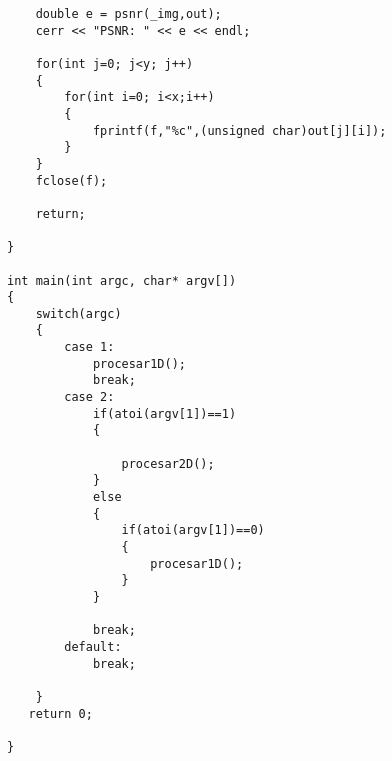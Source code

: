 \begin{lstlisting}
    double e = psnr(_img,out);
    cerr << "PSNR: " << e << endl;

    for(int j=0; j<y; j++)
    {
        for(int i=0; i<x;i++)
        {
            fprintf(f,"%c",(unsigned char)out[j][i]);
        }
    }
    fclose(f);

    return;

}

int main(int argc, char* argv[])
{
    switch(argc)
    {
        case 1:
            procesar1D();
            break;
        case 2:
            if(atoi(argv[1])==1)
            {
            
                procesar2D();
            }
            else 
            {   
                if(atoi(argv[1])==0)
                {
                    procesar1D();
                }
            }

            break;
        default:
            break;

    }
   return 0;

}
\end{lstlisting}
